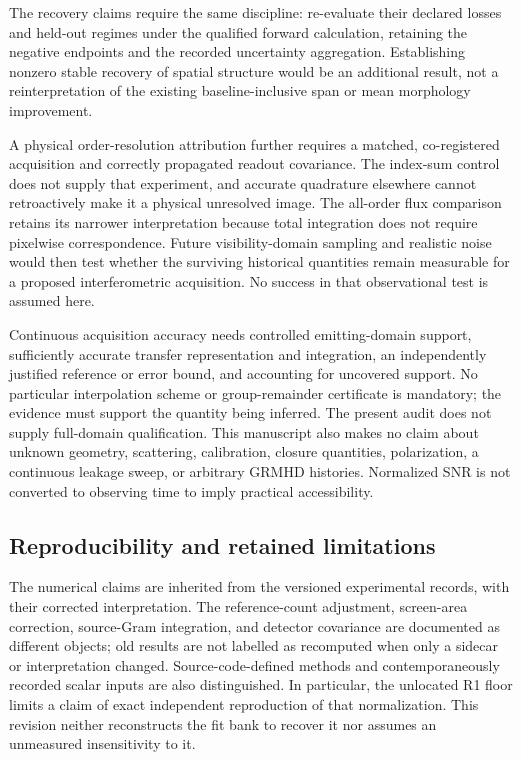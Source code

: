 The recovery claims require the same discipline: re-evaluate their declared losses and held-out regimes under the qualified forward calculation, retaining the negative endpoints and the recorded uncertainty aggregation. Establishing nonzero stable recovery of spatial structure would be an additional result, not a reinterpretation of the existing baseline-inclusive span or mean morphology improvement.

A physical order-resolution attribution further requires a matched, co-registered acquisition and correctly propagated readout covariance. The index-sum control does not supply that experiment, and accurate quadrature elsewhere cannot retroactively make it a physical unresolved image. The all-order flux comparison retains its narrower interpretation because total integration does not require pixelwise correspondence. Future visibility-domain sampling and realistic noise would then test whether the surviving historical quantities remain measurable for a proposed interferometric acquisition. No success in that observational test is assumed here.

Continuous acquisition accuracy needs controlled emitting-domain support, sufficiently accurate transfer representation and integration, an independently justified reference or error bound, and accounting for uncovered support. No particular interpolation scheme or group-remainder certificate is mandatory; the evidence must support the quantity being inferred. The present audit does not supply full-domain qualification. This manuscript also makes no claim about unknown geometry, scattering, calibration, closure quantities, polarization, a continuous leakage sweep, or arbitrary GRMHD histories. Normalized SNR is not converted to observing time to imply practical accessibility.

\subsection{Reproducibility and retained limitations}
The numerical claims are inherited from the versioned experimental records, with their corrected interpretation. The reference-count adjustment, screen-area correction, source-Gram integration, and detector covariance are documented as different objects; old results are not labelled as recomputed when only a sidecar or interpretation changed. Source-code-defined methods and contemporaneously recorded scalar inputs are also distinguished. In particular, the unlocated R1 floor limits a claim of exact independent reproduction of that normalization. This revision neither reconstructs the fit bank to recover it nor assumes an unmeasured insensitivity to it.

